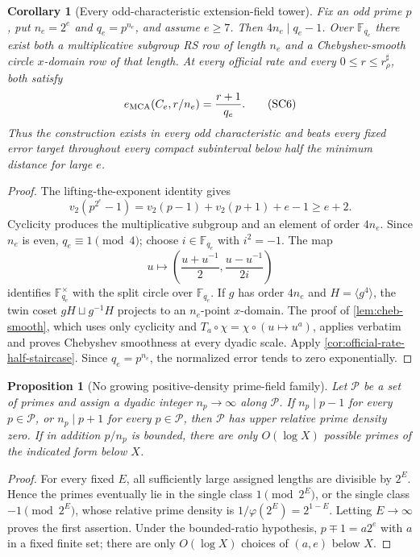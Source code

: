 \documentclass[11pt,a4paper]{amsart}
\numberwithin{equation}{section}
\newtheorem{proposition}[proposition]{Proposition}
\newtheorem{corollary}[corollary]{Corollary}
\theoremstyle{remark}
\newcommand{\F}{\mathbb F}
\newcommand{\Pcal}{\mathcal P}
\begin{document}
\begin{corollary}[Every odd-characteristic extension-field tower]
\label{cor:density-one-extension-towers}
Fix an odd prime \(p\), put \(n_e=2^e\) and \(q_e=p^{n_e}\), and assume
\(e\ge7\).  Then \(4n_e\mid q_e-1\).  Over \(\F_{q_e}\) there exist
both a multiplicative subgroup RS row of length \(n_e\) and a
Chebyshev-smooth circle \(x\)-domain row of that length.  At every
official rate and every \(0\le r\le r_\rho^\sharp\), both satisfy
\[
 e_{\rm MCA}(C_e,r/n_e)=\frac{r+1}{q_e}.           \tag{SC6}
\]
Thus the construction exists in every odd characteristic and beats every
fixed error target throughout every compact subinterval below half the
minimum distance for large \(e\).
\end{corollary}

\begin{proof}
The lifting-the-exponent identity gives
\[
 v_2(p^{2^e}-1)=v_2(p-1)+v_2(p+1)+e-1\ge e+2.
\]
Cyclicity produces the multiplicative subgroup and an element of order
\(4n_e\).  Since \(n_e\) is even, \(q_e\equiv1\pmod4\); choose
\(i\in\F_{q_e}\) with \(i^2=-1\).  The map
\[
 u\longmapsto
 \left(\frac{u+u^{-1}}2,\frac{u-u^{-1}}{2i}\right)
\]
identifies \(\F_{q_e}^\times\) with the split circle over
\(\F_{q_e}\).  If \(g\) has order \(4n_e\) and
\(H=\langle g^4\rangle\), the twin coset
\(gH\sqcup g^{-1}H\) projects to an \(n_e\)-point \(x\)-domain.
The proof of \cref{lem:cheb-smooth}, which uses only cyclicity and
\(T_a\circ\chi=\chi\circ(u\mapsto u^a)\), applies verbatim and proves
Chebyshev smoothness at every dyadic scale.
Apply \cref{cor:official-rate-half-staircase}.  Since
\(q_e=p^{n_e}\), the normalized error tends to zero exponentially.
\end{proof}

\begin{proposition}[No growing positive-density prime-field family]
\label{prop:no-growing-prime-density}
Let \(\Pcal\) be a set of primes and assign a dyadic integer
\(n_p\to\infty\) along \(\Pcal\).  If \(n_p\mid p-1\) for every
\(p\in\Pcal\), or \(n_p\mid p+1\) for every \(p\in\Pcal\), then
\(\Pcal\) has upper relative prime density zero.  If in addition
\(p/n_p\) is bounded, there are only \(O(\log X)\) possible primes of
the indicated form below \(X\).
\end{proposition}

\begin{proof}
For every fixed \(E\), all sufficiently large assigned lengths are
divisible by \(2^E\).  Hence the primes eventually lie in the single
class \(1\pmod {2^E}\), or the single class \(-1\pmod {2^E}\), whose
relative prime density is \(1/\varphi(2^E)=2^{1-E}\).  Letting
\(E\to\infty\) proves the first assertion.  Under the bounded-ratio
hypothesis, \(p\mp1=a2^e\) with \(a\) in a fixed finite set; there are
only \(O(\log X)\) choices of \((a,e)\) below \(X\).
\end{proof}
\end{document}

